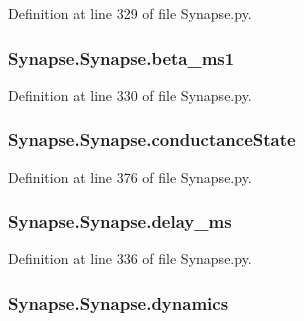 Definition at line 329 of file Synapse.\-py.

\hypertarget{class_synapse_1_1_synapse_ab59f413cbd21555531be209dee307a97}{
\subsubsection[{beta\-\_\-ms1}]{\setlength{\rightskip}{0pt plus 5cm}Synapse.\-Synapse.\-beta\-\_\-ms1}}\label{class_synapse_1_1_synapse_ab59f413cbd21555531be209dee307a97}


Definition at line 330 of file Synapse.\-py.

\hypertarget{class_synapse_1_1_synapse_a89d3762daa9c60be63403a5ce9fd9a84}{
\subsubsection[{conductance\-State}]{\setlength{\rightskip}{0pt plus 5cm}Synapse.\-Synapse.\-conductance\-State}}\label{class_synapse_1_1_synapse_a89d3762daa9c60be63403a5ce9fd9a84}


Definition at line 376 of file Synapse.\-py.

\hypertarget{class_synapse_1_1_synapse_a14adfda48133bd314f4dcd65fc9a2366}{
\subsubsection[{delay\-\_\-ms}]{\setlength{\rightskip}{0pt plus 5cm}Synapse.\-Synapse.\-delay\-\_\-ms}}\label{class_synapse_1_1_synapse_a14adfda48133bd314f4dcd65fc9a2366}


Definition at line 336 of file Synapse.\-py.

\hypertarget{class_synapse_1_1_synapse_a67a1454de1ef2f08ffa3a10bf8466158}{
\subsubsection[{dynamics}]{\setlength{\rightskip}{0pt plus 5cm}Synapse.\-Synapse.\-dynamics}}\label{class_synapse_1_1_synapse_a67a1454de1ef2f08ffa3a10bf8466158}


